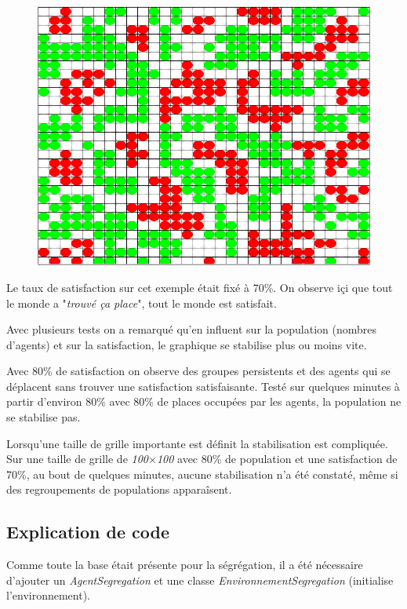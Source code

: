 \documentclass[a4paper,12pt]{report}
\begin{document}
\begin{figure}[!ht]
	\center
	\includegraphics[scale=0.4]{./image/segregation.png}
\end{figure}

Le taux de satisfaction sur cet exemple était fixé à 70\%. On observe içi que tout le monde a "\textit{trouvé ça place}", tout le monde est satisfait.

Avec plusieurs tests on a remarqué qu'en influent sur la population (nombres d'agents) et sur la satisfaction, le graphique se stabilise plus ou moins vite.

Avec 80\% de satisfaction on observe des groupes persistents et des agents qui se déplacent sans trouver une satisfaction satisfaisante. Testé sur quelques minutes à partir d'environ 80\% avec 80\% de places occupées par les agents, la population ne se stabilise pas.

Lorsqu'une taille de grille importante est définit la stabilisation est compliquée. Sur une taille de grille de \textit{100$\times$100} avec 80\% de population et une satisfaction de 70\%, au bout de quelques minutes, aucune stabilisation n'a été constaté, même si des regroupements de populations apparaîsent.

\subsection*{Explication de code}

Comme toute la base était présente pour la ségrégation, il a été nécessaire d'ajouter un \textit{AgentSegregation} et une classe \textit{EnvironnementSegregation} (initialise l'environnement).
\end{document}
